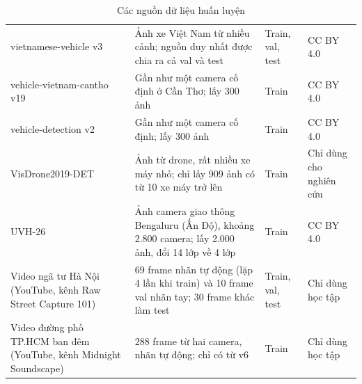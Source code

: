 \begin{table}[H]
  \centering
  \caption{Các nguồn dữ liệu huấn luyện}
  \label{tab:nguon-du-lieu}
  \small
  \begin{tabularx}{\linewidth}{P{3.4cm}LP{2.0cm}P{2.4cm}}
    \toprule
     &  &  &  \\ \midrule
    vietnamese-vehicle v3~\cite{roboflow_vnvehicle} & Ảnh xe Việt Nam từ nhiều cảnh; nguồn duy nhất được chia ra cả
      val và test & Train, val, test & CC BY 4.0 \\ \rowsep
    vehicle-vietnam-cantho v19~\cite{roboflow_cantho} & Gần như một camera cố định ở Cần Thơ; lấy 300 ảnh & Train &
      CC BY 4.0 \\ \rowsep
    vehicle-detection v2~\cite{roboflow_indo} & Gần như một camera cố định; lấy 300 ảnh & Train & CC BY 4.0 \\ \rowsep
    VisDrone2019-DET~\cite{zhu2022visdrone} & Ảnh từ drone, rất nhiều xe máy nhỏ; chỉ lấy 909 ảnh có từ 10 xe máy trở
      lên & Train & Chỉ dùng cho nghiên cứu \\ \rowsep
    UVH-26~\cite{sharma2025uvh26} & Ảnh camera giao thông Bengaluru (Ấn Độ), khoảng 2.800 camera; lấy 2.000 ảnh,
      đổi 14 lớp về 4 lớp & Train & CC BY 4.0 \\ \rowsep
    Video ngã tư Hà Nội (YouTube, kênh Raw Street Capture 101) & 69 frame nhãn tự động (lặp 4 lần khi train) và 10
      frame val nhãn tay; 30 frame khác làm test & Train, val, test & Chỉ dùng học tập \\ \rowsep
    Video đường phố TP.HCM ban đêm (YouTube, kênh Midnight Soundscape) & 288 frame từ hai camera, nhãn tự động; chỉ
      có từ v6 & Train & Chỉ dùng học tập \\ \bottomrule
  \end{tabularx}
\end{table}

